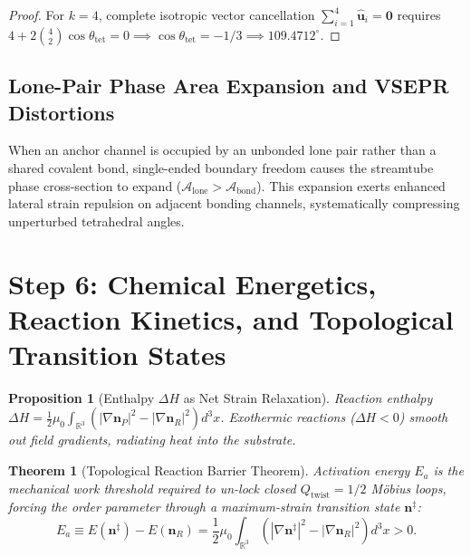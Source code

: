 \documentclass[11pt,a4paper]{article}
\newtheorem{prop}{Proposition}
\newtheorem{thm}{Theorem}
\begin{document}
	\begin{proof}
		For $k=4$, complete isotropic vector cancellation $\sum_{i=1}^4 \hat{\mathbf{u}}_i = \mathbf{0}$ requires $4 + 2 \binom{4}{2} \cos\theta_{\text{tet}} = 0 \implies \cos\theta_{\text{tet}} = -1/3 \implies \mathbf{109.4712^\circ}$.
	\end{proof}
	
	\subsection{Lone-Pair Phase Area Expansion and VSEPR Distortions}
	When an anchor channel is occupied by an unbonded lone pair rather than a shared covalent bond, single-ended boundary freedom causes the streamtube phase cross-section to expand ($\mathcal{A}_{\text{lone}} > \mathcal{A}_{\text{bond}}$). This expansion exerts enhanced lateral strain repulsion on adjacent bonding channels, systematically compressing unperturbed tetrahedral angles.
	
	\section{Step 6: Chemical Energetics, Reaction Kinetics, and Topological Transition States}
	\label{sec:step6_chemical_energetics}
	
	\begin{prop}[Enthalpy $\Delta H$ as Net Strain Relaxation]
		Reaction enthalpy $\Delta H = \frac{1}{2}\mu_0 \int_{\mathbb{R}^3} \left( |\nabla \mathbf{n}_P|^2 - |\nabla \mathbf{n}_R|^2 \right) d^3x$. Exothermic reactions ($\Delta H < 0$) smooth out field gradients, radiating heat into the substrate.
	\end{prop}
	
	\begin{thm}[Topological Reaction Barrier Theorem]
		\label{thm:activation_energy}
		Activation energy $E_a$ is the mechanical work threshold required to un-lock closed $Q_{\text{twist}} = 1/2$ Möbius loops, forcing the order parameter through a maximum-strain transition state $\mathbf{n}^\ddagger$:
		\begin{equation}
			E_a \equiv E(\mathbf{n}^\ddagger) - E(\mathbf{n}_R) = \frac{1}{2}\mu_0 \int_{\mathbb{R}^3} \left( |\nabla \mathbf{n}^\ddagger|^2 - |\nabla \mathbf{n}_R|^2 \right) d^3x > 0.
		\end{equation}
	\end{thm}
	
\end{document}
